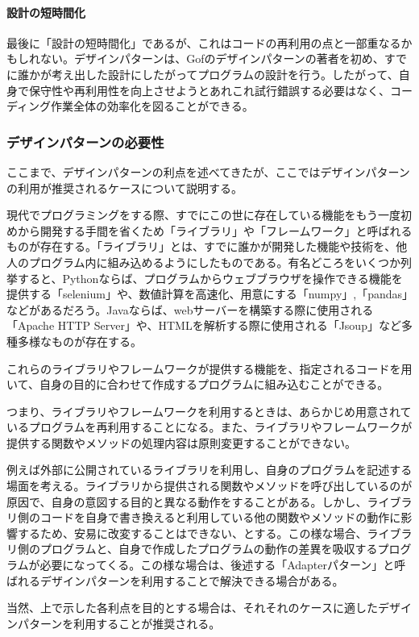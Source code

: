 \documentclass[dvipdfmx]{jsarticle}
\begin{document}
\paragraph{設計の短時間化}最後に「設計の短時間化」であるが、これはコードの再利用の点と一部重なるかもしれない。デザインパターンは、Gofのデザインパターンの著者を初め、すでに誰かが考え出した設計にしたがってプログラムの設計を行う。したがって、自身で保守性や再利用性を向上させようとあれこれ試行錯誤する必要はなく、コーディング作業全体の効率化を図ることができる。
\subsubsection{デザインパターンの必要性}
ここまで、デザインパターンの利点を述べてきたが、ここではデザインパターンの利用が推奨されるケースについて説明する。\par
現代でプログラミングをする際、すでにこの世に存在している機能をもう一度初めから開発する手間を省くため「ライブラリ」や「フレームワーク」と呼ばれるものが存在する。「ライブラリ」とは、すでに誰かが開発した機能や技術を、他人のプログラム内に組み込めるようにしたものである。有名どころをいくつか列挙すると、Pythonならば、プログラムからウェブブラウザを操作できる機能を提供する「selenium」や、数値計算を高速化、用意にする「numpy」,「pandas」などがあるだろう。Javaならば、webサーバーを構築する際に使用される「Apache HTTP Server」や、HTMLを解析する際に使用される「Jsoup」など多種多様なものが存在する。\par
これらのライブラリやフレームワークが提供する機能を、指定されるコードを用いて、自身の目的に合わせて作成するプログラムに組み込むことができる。\par
つまり、ライブラリやフレームワークを利用するときは、あらかじめ用意されているプログラムを再利用することになる。また、ライブラリやフレームワークが提供する関数やメソッドの処理内容は原則変更することができない。\par
例えば外部に公開されているライブラリを利用し、自身のプログラムを記述する場面を考える。ライブラリから提供される関数やメソッドを呼び出しているのが原因で、自身の意図する目的と異なる動作をすることがある。しかし、ライブラリ側のコードを自身で書き換えると利用している他の関数やメソッドの動作に影響するため、安易に改変することはできない、とする。この様な場合、ライブラリ側のプログラムと、自身で作成したプログラムの動作の差異を吸収するプログラムが必要になってくる。この様な場合は、後述する「Adapterパターン」と呼ばれるデザインパターンを利用することで解決できる場合がある。\par
当然、上で示した各利点を目的とする場合は、それそれのケースに適したデザインパターンを利用することが推奨される。
\end{document}
